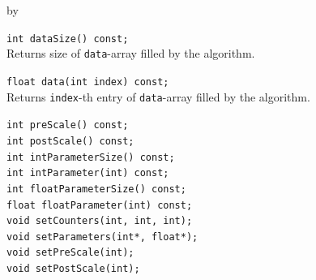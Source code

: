 \documentclass[twoside]{article}
\newcommand{\entrylabel}[1]{\mbox{\textbf{{#1}}}\hfil}%
\newenvironment{entry}
{\begin{list}{}%
    {\renewcommand{\makelabel}{\entrylabel}%
     \setlength{\labelwidth}{90pt}%
     \setlength{\leftmargin}{\labelwidth}
     \advance\leftmargin by \labelsep%
      }%
    }%
  {\end{list}}
\newcommand{\Entrylabel}[1]%
{\raisebox{0pt}[1ex][0pt]{\makebox[\labelwidth][l]%
    {\parbox[t]{\labelwidth}{\hspace{0pt}\textbf{{#1}}}}}}
\newenvironment{Entry}%
{\renewcommand{\entrylabel}{\Entrylabel}\begin{entry}}%
  {\end{entry}}
\begin{document}
\begin{Entry}
    \verb+int dataSize() const;+\\
        Returns size of \texttt{data}-array filled by the algorithm.

    \verb+float data(int index) const;+\\
        Returns \texttt{index}-th entry of \texttt{data}-array filled
        by the algorithm.
 
    \verb+int preScale() const;+\\
    \verb+int postScale() const;+\\
    \verb+int intParameterSize() const;+\\
    \verb+int intParameter(int) const;+\\
    \verb+int floatParameterSize() const;+\\
    \verb+float floatParameter(int) const;+\\

    \verb+void setCounters(int, int, int);+\\
    \verb+void setParameters(int*, float*);+\\
    \verb+void setPreScale(int);+\\
    \verb+void setPostScale(int);+\\

\end{Entry}
\clearpage
\end{document}
